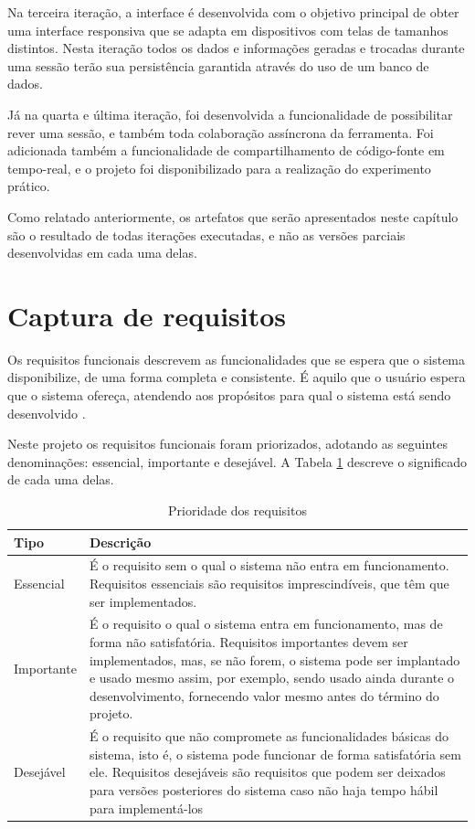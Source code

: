 Na terceira iteração, a interface é desenvolvida com o objetivo principal de obter uma interface responsiva que se adapta em dispositivos com telas de tamanhos distintos. Nesta iteração todos os dados e informações geradas e trocadas durante uma sessão terão sua persistência garantida através do uso de um banco de dados.

Já na quarta e última iteração, foi desenvolvida a funcionalidade de possibilitar rever uma sessão, e também toda colaboração assíncrona da ferramenta. Foi adicionada também a funcionalidade de compartilhamento de código-fonte em tempo-real, e o projeto foi disponibilizado para a realização do experimento prático.

Como relatado anteriormente, os artefatos que serão apresentados neste capítulo são o resultado de todas iterações executadas, e não as versões parciais desenvolvidas em cada uma delas.

\section{Captura de requisitos}

Os requisitos funcionais descrevem as funcionalidades que se espera que o sistema disponibilize, de uma forma completa e consistente. É aquilo que o usuário espera que o sistema ofereça, atendendo aos propósitos para qual o sistema está sendo desenvolvido \cite{padua05}.

Neste projeto os requisitos funcionais foram priorizados, adotando as seguintes denominações: essencial, importante e desejável. A Tabela \ref{tab:prioridade_req} descreve o significado de cada uma delas.

\bgroup
\def\arraystretch{1.5} %
\begin{table}[h]{} %
\caption{Prioridade dos requisitos}
\centering
\begin{tabular}{ | p{3cm} | p{10cm}| } \hline
\textbf{Tipo} & \textbf{Descrição} \\ \hline
Essencial & É o requisito sem o qual o sistema não entra em funcionamento. Requisitos essenciais são requisitos imprescindíveis, que têm que ser implementados.  \\ \hline
Importante  & É o requisito o qual o sistema entra em funcionamento, mas de forma não satisfatória. Requisitos importantes devem ser implementados, mas, se não forem, o sistema pode ser implantado e usado mesmo assim, por exemplo, sendo usado ainda durante o desenvolvimento, fornecendo valor mesmo antes do término do projeto.  \\ \hline
Desejável  & É o requisito que não compromete as funcionalidades básicas do sistema, isto é, o sistema pode funcionar de forma satisfatória sem ele. Requisitos desejáveis são requisitos que podem ser deixados para versões posteriores do sistema caso não haja tempo hábil para implementá-los  \\ \hline
\end{tabular}
\label{tab:prioridade_req}
\end{table}
\egroup

